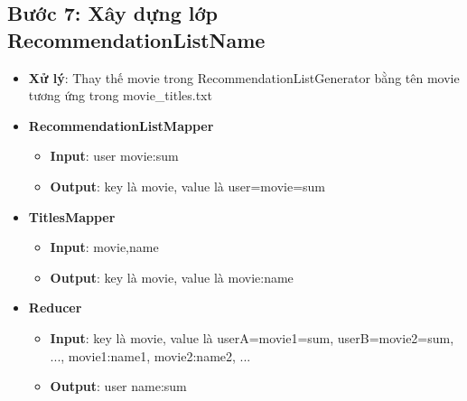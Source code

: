 \subsection*{Bước 7: Xây dựng lớp RecommendationListName}
\begin{itemize}
    \item \textbf{Xử lý}: Thay thế movie trong RecommendationListGenerator bằng tên movie tương ứng trong movie\_titles.txt
    \item \textbf{RecommendationListMapper}
          \begin{itemize}
              \item \textbf{Input}: user \quad movie:sum \\
              \item \textbf{Output}: key là movie, value là user=movie=sum \\
          \end{itemize}
    \item \textbf{TitlesMapper}
          \begin{itemize}
              \item \textbf{Input}: movie,name \\
              \item \textbf{Output}: key là movie, value là movie:name \\
          \end{itemize}
    \item \textbf{Reducer}
          \begin{itemize}
              \item \textbf{Input}: key là movie, value là userA=movie1=sum, userB=movie2=sum, ..., movie1:name1, movie2:name2, ... \\
              \item \textbf{Output}: user \quad name:sum\\
          \end{itemize}
\end{itemize}

